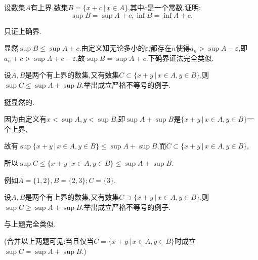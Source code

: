      \begin{exercise}
         设数集$A$有上界,数集$B=\{x+c\,\lvert\, x\in A\}$,其中$c$是一个常数.证明:\,
         \[
             \sup B=\sup A+c,\inf B=\inf A+c.
         \]
     \end{exercise}
     \begin{solution}
         只证上确界.

         显然$\sup B\leqslant\sup A+c$.由定义知无论多小的$\varepsilon$,都存在$n$使得$a_n>\sup A-\varepsilon$,即$a_n+c>\sup A+c-\varepsilon$,故$\sup B=\sup A+c$.下确界证法完全类似.
     \end{solution}

     \begin{exercise}
         设$A,B$是两个有上界的数集,又有数集$C\subset \{x+y\,\lvert\, x\in A,y\in B\}$,则$\sup C\leqslant \sup A+\sup B$.举出成立严格不等号的例子.
     \end{exercise}
     \begin{solution}
         挺显然的.

         因为由定义有$x<\sup A,y<\sup B$,即$\sup A+\sup B$是$\{x+y\,\lvert\,x\in A,y\in B\}$一个上界,

         故有$\sup \{x+y\,\lvert\,x\in A,y\in B\}\leqslant\sup A+\sup B$,而$C\subset \{x+y\,\lvert\,x\in A,y\in B\}$,

         所以$\sup C\leqslant \{x+y\,\lvert\,x\in A,y\in B\}\leqslant\sup A+\sup B$.

         例如$A=\{1,2\},B=\{2,3\};C=\{3\}$.
     \end{solution}

     \begin{exercise}
         设$A,B$是两个有上界的数集,又有数集$C\supset  \{x+y\,\lvert\, x\in A,y\in B\}$,则$\sup C\geqslant \sup A+\sup B$.举出成立严格不等号的例子.
     \end{exercise}
     \begin{solution}
         与上题完全类似.
     \end{solution}
     \begin{note}
         (合并以上两题可见:当且仅当$C=\{x+y\,\lvert\, x\in A,y\in B\}$时成立$\sup C=\sup A+\sup B$.)
     \end{note}
